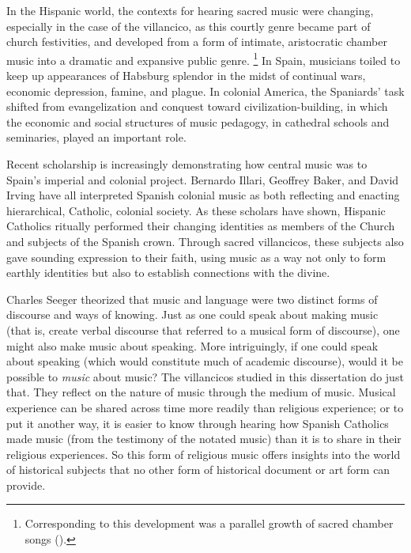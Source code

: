 In the Hispanic world, the contexts for hearing sacred music were changing, especially in the case of the villancico, as this courtly genre became part of church festivities, and developed from a form of intimate, aristocratic chamber music into a dramatic and expansive public genre.%
	\footnote{%
	Corresponding to this development was a parallel growth of sacred chamber songs ().
	}
In Spain, musicians toiled to keep up appearances of Habsburg splendor in the midst of continual wars, economic depression, famine, and plague.
In colonial America, the Spaniards' task shifted from evangelization and conquest toward civilization-building, in which the economic and social structures of music pedagogy, in cathedral schools and seminaries, played an important role.

Recent scholarship is increasingly demonstrating how central music was to Spain's imperial and colonial project.
Bernardo Illari, Geoffrey Baker, and David Irving have all interpreted Spanish colonial music as both reflecting and enacting hierarchical, Catholic, colonial society.%
	\autocites{Illari:Polychoral}{Baker:Harmony}{Irving:Colonial}
As these scholars have shown, Hispanic Catholics ritually performed their changing identities as members of the Church and subjects of the Spanish crown. 
Through sacred villancicos, these subjects also gave sounding expression to their faith, using music as a way not only to form earthly identities but also to establish connections with the divine.

Charles Seeger theorized that music and language were two distinct forms of discourse and ways of knowing.%
	\autocite{Seeger:Unitary}
Just as one could speak about making music (that is, create verbal discourse that referred to a musical form of discourse), one might also make music about speaking.
More intriguingly, if one could speak about speaking (which would constitute much of academic discourse), would it be possible to \emph{music} about music? 
The villancicos studied in this dissertation do just that. 
They reflect on the nature of music through the medium of music.
Musical experience can be shared across time more readily than religious experience; or to put it another way, it is easier to know through hearing how Spanish Catholics made music (from the testimony of the notated music) than it is to share in their religious experiences.
So this form of religious music offers insights into the world of historical subjects that no other form of historical document or art form can provide.

